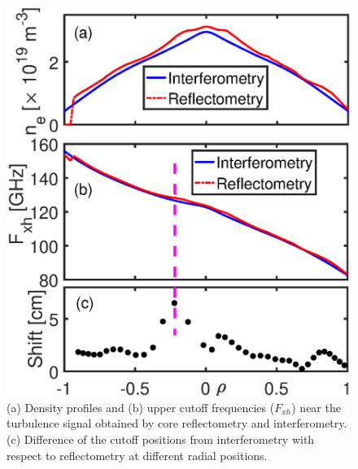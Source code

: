 \begin{figure}[h]
\begin{centering}
\includegraphics[scale=0.67]{fig_Shift.eps}
\par\end{centering}
\caption{(a) Density profiles and (b) upper cutoff frequencies ($F_{xh}$) near the turbulence signal
obtained by core reflectometry and interferometry. (c) Difference of the cutoff positions from interferometry with respect to reflectometry at different radial positions.}
\label{fig:Shift}
\end{figure}


